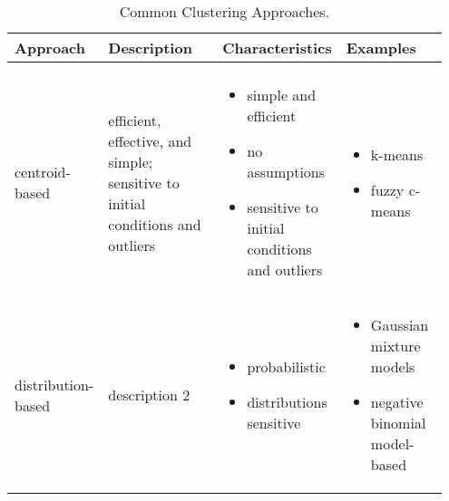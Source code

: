 \begin{sidewaystable*}[!hbtp]
    \centering
    \caption{Common Clustering Approaches.}
    \label{tab:clusterApproaches} 
    \begin{tabular}{
    >{\raggedright\arraybackslash}p{0.15\linewidth} 
    >{\raggedright\arraybackslash}p{0.30\linewidth} 
    >{\raggedright\arraybackslash}p{0.25\linewidth} 
    >{\raggedright\arraybackslash}p{0.25\linewidth}
    }
        \hline 
        Approach & Description & Characteristics & Examples \\ 
        \hline \\ [-0.5em]
        
        centroid-based \linebreak & 
        efficient, effective, and simple; sensitive to initial conditions and outliers  \linebreak &
        \vspace{-1em}
        \begin{itemize}[nosep,leftmargin=*,label={--}]
            \item[\scriptsize\faPlusCircle] simple and efficient
            \item[\scriptsize\faPlusCircle] no assumptions
            \item[\scriptsize\faMinusCircle] sensitive to initial conditions and outliers
        \end{itemize}\linebreak & 
        \vspace{-1em}
        \begin{itemize}[nosep,leftmargin=*,label={--}]
            \item k-means
            \item fuzzy c-means
        \end{itemize}\linebreak \\ 
        
        distribution-based \linebreak & 
        description 2 \linebreak &
        \vspace{-1em}
        \begin{itemize}[nosep,leftmargin=*,label={--}]
            \item[\scriptsize\faPlusCircle] probabilistic
            \item[\scriptsize\faMinusCircle] distributions sensitive
        \end{itemize}\linebreak & 
        \vspace{-1em}
        \begin{itemize}[nosep,leftmargin=*,label={--}]
            \item Gaussian mixture models
            \item negative binomial model-based
        \end{itemize}\linebreak\\ 
        

\end{tabular}
\end{sidewaystable*}
